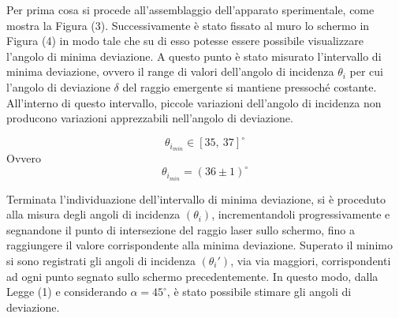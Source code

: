 Per prima cosa si procede all'assemblaggio dell'apparato sperimentale, come mostra la Figura (3). Successivamente è stato fissato al muro lo schermo in Figura (4) in modo tale che su di esso potesse essere possibile visualizzare l'angolo di minima deviazione. A questo punto è stato misurato l'intervallo di minima deviazione, ovvero il range di valori dell'angolo di incidenza $\theta_i$ per cui l'angolo di deviazione $\delta$ del raggio emergente si mantiene pressoché costante. All'interno di questo intervallo, piccole variazioni dell'angolo di incidenza non producono variazioni apprezzabili nell'angolo di deviazione.

\begin{equation}
	\theta_{i_{min}}\in[35,\ 37]^\circ
\end{equation}
Ovvero
\begin{equation}
	\theta_{i_{min}}=(36\pm 1)^\circ
\end{equation}

Terminata l'individuazione dell'intervallo di minima deviazione, si è proceduto alla misura degli angoli di incidenza $(\theta_i)$, incrementandoli progressivamente e segnandone il punto di intersezione del raggio laser sullo schermo, fino a raggiungere il valore corrispondente alla minima deviazione. Superato il minimo si sono registrati gli angoli di incidenza $(\theta_i')$, via via maggiori, corrispondenti ad ogni punto segnato sullo schermo precedentemente. In questo modo, dalla Legge (1) e considerando $\alpha=45^\circ$, è stato possibile stimare gli angoli di deviazione.

